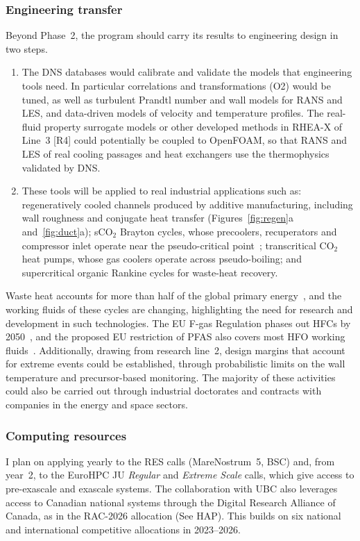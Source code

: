 \documentclass[11pt]{article}
\begin{document}
\subsubsection{Engineering transfer} 
Beyond Phase~2, the program should carry its results to engineering design in two steps.
\begin{enumerate}
	\item The DNS databases would calibrate and validate the models that engineering tools need. In particular correlations and transformations (O2) would be tuned, as well as turbulent Prandtl number and wall models for RANS and LES, and data-driven models of velocity and temperature profiles. The real-fluid property surrogate models or other developed methods in RHEA-X of Line~3 [R4] could potentially be coupled to OpenFOAM, so that RANS and LES of real cooling passages and heat exchangers use the thermophysics validated by DNS.
	
	\item These tools will be applied to real industrial applications such as: regeneratively cooled channels produced by additive manufacturing, including wall roughness and conjugate heat transfer (Figures~\ref{fig:regen}a and~\ref{fig:duct}a); 
	sCO$_2$ Brayton cycles, whose precoolers, recuperators and compressor inlet operate near the pseudo-critical point~\cite{Ahn2015}; 
	transcritical CO$_2$ heat pumps, whose gas coolers operate across pseudo-boiling; and supercritical organic Rankine cycles for waste-heat recovery. 
\end{enumerate}
Waste heat accounts for more than half of the global primary energy~\cite{Markides2025}, and the working fluids of these cycles are changing, highlighting the need for research and development in such technologies. The EU F-gas Regulation phases out HFCs by 2050~\cite{FGas2024}, and the proposed EU restriction of PFAS also covers most HFO working fluids~\cite{ECHA2025}. 
Additionally, drawing from research line~2, design margins that account for extreme events could be established, through probabilistic limits on the wall temperature and precursor-based monitoring.
The majority of these activities could also be carried out through industrial doctorates and contracts with companies in the energy and space sectors.


\subsubsection{Computing resources} 
I plan on applying yearly to the RES calls (MareNostrum~5, BSC) and, from year~2, to the EuroHPC JU \emph{Regular} and \emph{Extreme Scale} calls, which give access to pre-exascale and exascale systems. 
The collaboration with UBC also leverages access to Canadian
national systems through the Digital Research Alliance of Canada, as in the RAC-2026 allocation (See HAP). 
This builds on six national and international competitive allocations in 2023--2026.
\end{document}
